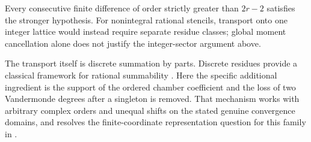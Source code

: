 Every consecutive finite difference of order strictly greater than
$2r-2$ satisfies the stronger hypothesis.  For nonintegral rational
stencils, transport onto one integer lattice would instead require
separate residue classes; global moment cancellation alone does not
justify the integer-sector argument above.

The transport itself is discrete summation by parts.  Discrete residues
provide a classical framework for rational summability
\cite{chen-singer}.  Here the specific additional ingredient is the
support of the ordered chamber coefficient and the loss of two
Vandermonde degrees after a singleton is removed.  That mechanism works
with arbitrary complex orders and unequal shifts on the stated genuine
convergence domains, and resolves the finite-coordinate representation
question for this family in \cite{repo:finite}.
